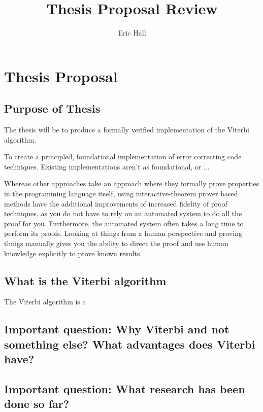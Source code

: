 \documentclass{article}
\title{Thesis Proposal Review}
\author{Eric Hall}
\begin{document}
\maketitle

\section{Thesis Proposal}

\subsection{Purpose of Thesis}

The thesis will be to produce a formally verified implementation of the Viterbi algorithm.

To create a principled, foundational implementation of error correcting code techniques. Existing implementations aren't as foundational, or ...

Whereas other approaches take an approach where they formally prove properties in the programming language itself, using interactive-theorem prover based methods have the additional improvements of increased fidelity of proof techniques, as you do not have to rely on an automated system to do all the proof for you. Furthermore, the automated system often takes a long time to perform its proofs. Looking at things from a human perspective and proving thnigs manually gives you the ability to direct the proof and use human knowledge explicitly to prove known results.

\subsection{What is the Viterbi algorithm}

The Viterbi algorithm is a 

\subsection{Important question: Why Viterbi and not something else? What advantages does Viterbi have?}

\subsection{Important question: What research has been done so far?}

\subsection{}
\end{document}
